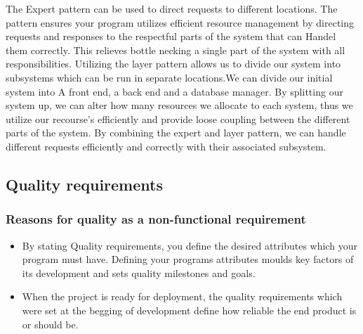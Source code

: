 \documentclass[]{article}
\begin{document}
    \begin{flushleft}
    The Expert pattern can be used to direct requests to different locations. The pattern ensures your program utilizes efficient resource management by directing requests and responses to the respectful parts of the system that can Handel them correctly. This relieves bottle necking a single part of the system with all responsibilities.
    \linebreak
    Utilizing the layer pattern allows us to divide our system into subsystems which can be run in separate locations.We can divide our initial system into A front end, a back end and a database manager. By splitting our system up, we can alter how many resources we allocate to each system, thus we utilize our recourse's efficiently and provide loose coupling between the different parts of the system. 
    \linebreak
    By combining the expert and layer pattern, we can handle different requests efficiently and correctly with their associated subsystem. 
    \end{flushleft}

\subsection{Quality requirements}
    \subsubsection{Reasons for quality as a non-functional requirement}
    \begin{itemize}
        \item By stating Quality requirements, you define the desired attributes which your program must have. Defining your programs attributes moulds key factors of its development and sets quality milestones and goals.  
        
        \item When the project is ready for deployment, the quality requirements which were set at the begging of development define how reliable the end product is or should be.
    \end{itemize}
    
\end{document}
